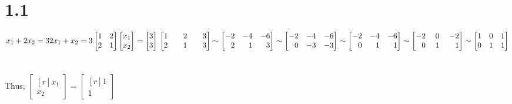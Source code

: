 \documentclass{article}
\begin{document}
\section*{1.1}
\(x_1 + 2x_2 = 3\\
2x_1 + x_2 = 3\\
\\
\begin{bmatrix*}[r]
1 & 2\\
2 & 1
\end{bmatrix*}
\begin{bmatrix*}[r]
x_1 \\
x_2 
\end{bmatrix*} = \begin{bmatrix*}[r]
3\\
3
\end{bmatrix*}\\ \\ \\
\begin{bmatrix*}[r]
1 &\quad 2 &\quad 3\\
2 &\quad 1 &\quad 3
\end{bmatrix*} \sim  \begin{bmatrix*}[r]
-2 & -4 & -6\\
2 & 1 & 3
\end{bmatrix*} \sim  \begin{bmatrix*}[r]
-2 & -4 & -6\\
0 & -3 & -3
\end{bmatrix*} \sim  \begin{bmatrix*}[r]
-2 & -4 & -6\\
0 & 1 & 1
\end{bmatrix*} \sim  \begin{bmatrix*}[r]
-2 &\; 0 &\;-2\\
0 &\; 1 &\; 1
\end{bmatrix*} \sim  \begin{bmatrix*}[r]
1 & 0 & 1\\
0 & 1 & 1
\end{bmatrix*}
\)\\ \\ \\
Thus, \( \begin{bmatrix*}[r]
x_1\\ x_2 \end{bmatrix*} = \begin{bmatrix*}[r] 1\\ 1\end{bmatrix*}
\)
\end{document}
